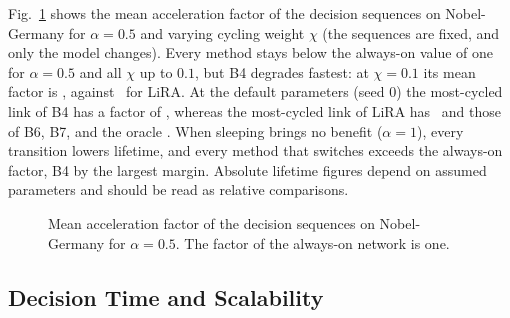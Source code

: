 \documentclass[preprint,12pt]{elsarticle}
\begin{document}
Fig.~\ref{fig:wear} shows the mean acceleration factor of the decision sequences on Nobel-Germany for $\alpha=0.5$ and varying cycling weight $\chi$ (the sequences are fixed, and only the model changes). Every method stays below the always-on value of one for $\alpha=0.5$ and all $\chi$ up to $0.1$, but B4 degrades fastest: at $\chi=0.1$ its mean factor is \wearBigChiBFour, against \wearBigChiLiRA\ for LiRA. At the default parameters (seed 0) the most-cycled link of B4 has a factor of \maxAFfour, whereas the most-cycled link of LiRA has \maxAFlira\ and those of B6, B7, and the oracle \maxAFothers. When sleeping brings no benefit ($\alpha=1$), every transition lowers lifetime, and every method that switches exceeds the always-on factor, B4 by the largest margin. Absolute lifetime figures depend on assumed parameters and should be read as relative comparisons.

\begin{figure}[t]
\centering
{}
\caption{Mean acceleration factor of the decision sequences on Nobel-Germany for $\alpha=0.5$. The factor of the always-on network is one.}
\label{fig:wear}
\end{figure}

\subsection{Decision Time and Scalability}\label{sec:res-time}
\end{document}
